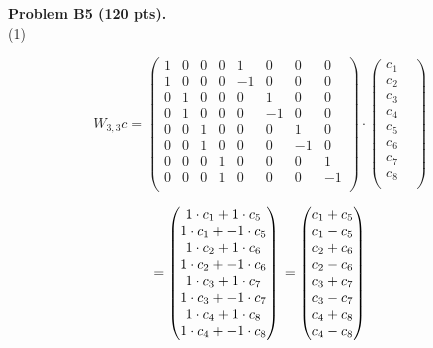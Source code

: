 \documentclass[12pt]{article}
\begin{document}
\vspace {0.25cm}\noindent
{\bf Problem B5 (120 pts).} \\
\medskip
(1)

\[
W_{3, 3} c =
\begin{pmatrix}
1  &  0  &  0 & 0 & 1   &  0   & 0    & 0  \\
1  &  0  &  0 & 0 & -1 &  0   & 0    & 0  \\
0   &  1  &  0 & 0 &  0  & 1   & 0    & 0  \\
0   &  1  &  0 & 0 &  0  & -1 & 0    & 0  \\
0   &  0  &  1 & 0 &  0  &  0  & 1    & 0  \\
0   &  0  &  1 & 0 &  0  &  0  & -1  & 0  \\
0   &  0  &  0 & 1 &  0  &  0  & 0    & 1  \\
0   &  0  &  0 & 1 &  0  &  0  & 0    & -1  \\
\end{pmatrix}
\cdot
\begin{pmatrix}
c_1 & \\
c_2 & \\
c_3 & \\
c_4 & \\
c_5 & \\
c_6 & \\
c_7 & \\
c_8 \\
\end{pmatrix}
\]

\[
= 
\begin{pmatrix}
1 \cdot c_1 + 1 \cdot c_5 \\
1 \cdot c_1 + -1 \cdot c_5 \\
1 \cdot c_2 + 1 \cdot c_6 \\
1 \cdot c_2 + -1 \cdot c_6\\
1 \cdot c_3 + 1 \cdot c_7 \\
1 \cdot c_3 + - 1 \cdot c_7 \\
1 \cdot c_4 + 1 \cdot c_8 \\
1 \cdot c_4 + -1 \cdot c_8 \\
\end{pmatrix}
\\ 
= 
\begin{pmatrix}
c_1 + c_5 \\
c_1 - c_5 \\
c_2 + c_6 \\
c_2 - c_6\\
c_3 + c_7 \\
c_3 - c_7 \\
c_4 + c_8 \\
c_4 - c_8 \\
\end{pmatrix}
\]
\end{document}
